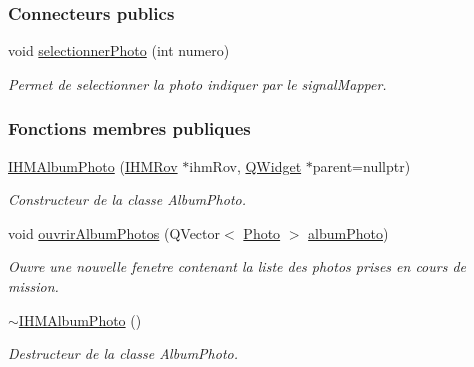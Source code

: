 \subsubsection*{Connecteurs publics}
\begin{DoxyCompactItemize}
\item 
void \hyperlink{class_i_h_m_album_photo_ad0760043151686deea04f8282e6d2210}{selectionner\+Photo} (int numero)
\begin{DoxyCompactList}\small\item\em Permet de selectionner la photo indiquer par le signal\+Mapper. \end{DoxyCompactList}\end{DoxyCompactItemize}
\subsubsection*{Fonctions membres publiques}
\begin{DoxyCompactItemize}
\item 
\hyperlink{class_i_h_m_album_photo_aefa56aaad40d6cb0ddcf769f149ab0ad}{I\+H\+M\+Album\+Photo} (\hyperlink{class_i_h_m_rov}{I\+H\+M\+Rov} $\ast$ihm\+Rov, \hyperlink{class_q_widget}{Q\+Widget} $\ast$parent=nullptr)
\begin{DoxyCompactList}\small\item\em Constructeur de la classe Album\+Photo. \end{DoxyCompactList}\item 
void \hyperlink{class_i_h_m_album_photo_a5aa9a9c1b04e00eaec1581e92649535f}{ouvrir\+Album\+Photos} (Q\+Vector$<$ \hyperlink{struct_photo}{Photo} $>$ \hyperlink{class_i_h_m_album_photo_a686adeccd626a94d9a4996782c851c61}{album\+Photo})
\begin{DoxyCompactList}\small\item\em Ouvre une nouvelle fenetre contenant la liste des photos prises en cours de mission. \end{DoxyCompactList}\item 
\hyperlink{class_i_h_m_album_photo_a02812cbcaa5467a2e6419ed9d5904cc6}{$\sim$\+I\+H\+M\+Album\+Photo} ()
\begin{DoxyCompactList}\small\item\em Destructeur de la classe Album\+Photo. \end{DoxyCompactList}\end{DoxyCompactItemize}
